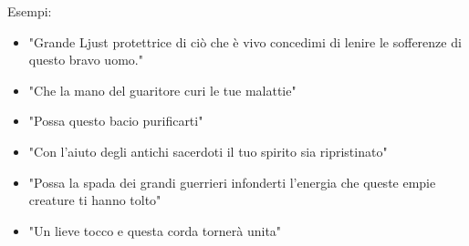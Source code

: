 \documentclass[a4paper,11pt,twoside,openany]{book}
\begin{document}
Esempi:
\begin{itemize}
	\item
	"Grande Ljust protettrice di ciò che è vivo concedimi di lenire le sofferenze di questo bravo uomo."
	\item
	"Che la mano del guaritore curi le tue malattie"
	\item
	"Possa questo bacio purificarti"
	\item
	"Con l'aiuto degli antichi sacerdoti il tuo spirito sia ripristinato"
	\item
	"Possa la spada dei grandi guerrieri infonderti l'energia che queste empie creature ti hanno tolto"
	\item "Un lieve tocco e questa corda tornerà unita"
\end{itemize}

\bigskip
\end{document}
